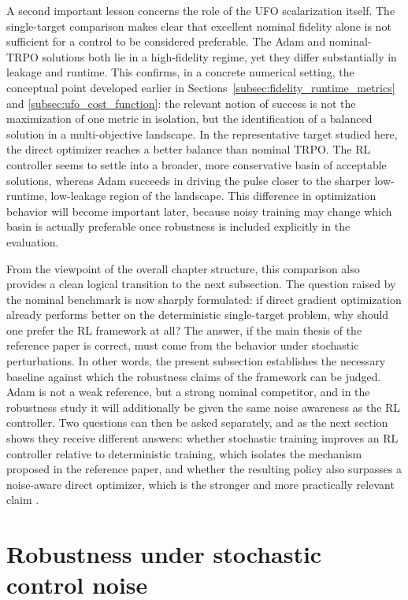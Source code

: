 A second important lesson concerns the role of the UFO scalarization itself. The single-target comparison makes clear that excellent nominal fidelity alone is not sufficient for a control to be considered preferable. The Adam and nominal-TRPO solutions both lie in a high-fidelity regime, yet they differ substantially in leakage and runtime. This confirms, in a concrete numerical setting, the conceptual point developed earlier in Sections~\ref{subsec:fidelity_runtime_metrics} and \ref{subsec:ufo_cost_function}: the relevant notion of success is not the maximization of one metric in isolation, but the identification of a balanced solution in a multi-objective landscape. In the representative target studied here, the direct optimizer reaches a better balance than nominal TRPO. The RL controller seems to settle into a broader, more conservative basin of acceptable solutions, whereas Adam succeeds in driving the pulse closer to the sharper low-runtime, low-leakage region of the landscape. This difference in optimization behavior will become important later, because noisy training may change which basin is actually preferable once robustness is included explicitly in the evaluation.

From the viewpoint of the overall chapter structure, this comparison also provides a clean logical transition to the next subsection. The question raised by the nominal benchmark is now sharply formulated: if direct gradient optimization already performs better on the deterministic single-target problem, why should one prefer the RL framework at all? The answer, if the main thesis of the reference paper is correct, must come from the behavior under stochastic perturbations. In other words, the present subsection establishes the necessary baseline against which the robustness claims of the framework can be judged. Adam is not a weak reference, but a strong nominal competitor, and in the robustness study it will additionally be given the same noise awareness as the RL controller. Two questions can then be asked separately, and as the next section shows they receive different answers: whether stochastic training improves an RL controller relative to deterministic training, which isolates the mechanism proposed in the reference paper, and whether the resulting policy also surpasses a noise-aware direct optimizer, which is the stronger and more practically relevant claim \cite{Niu2019}.



\section{Robustness under stochastic control noise}
\label{sec:robustness_under_stochastic_control_noise}
